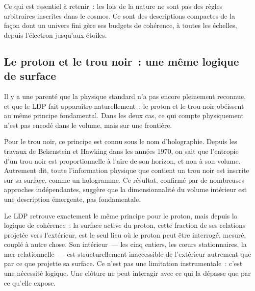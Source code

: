 \documentclass[12pt, a4paper, openright]{book}
\begin{document}
\medskip

Ce qui est essentiel à retenir~: les lois de la nature ne sont pas des règles arbitraires inscrites dans le cosmos. Ce sont des descriptions compactes de la façon dont un univers fini gère ses budgets de cohérence, à toutes les échelles, depuis l'électron jusqu'aux étoiles.

\subsection*{Le proton et le trou noir~: une même logique de surface}

Il y a une parenté que la physique standard n'a pas encore pleinement reconnue, et que le LDP fait apparaître naturellement~: le proton et le trou noir obéissent au même principe fondamental. Dans les deux cas, ce qui compte physiquement n'est pas encodé dans le volume, mais sur une frontière.

\medskip

Pour le trou noir, ce principe est connu sous le nom d'holographie. Depuis les travaux de Bekenstein et Hawking dans les années 1970, on sait que l'entropie d'un trou noir est proportionnelle à l'aire de son horizon, et non à son volume. Autrement dit, toute l'information physique que contient un trou noir est inscrite sur sa surface, comme un hologramme. Ce résultat, confirmé par de nombreuses approches indépendantes, suggère que la dimensionnalité du volume intérieur est une description émergente, pas fondamentale.

\medskip

Le LDP retrouve exactement le même principe pour le proton, mais depuis la logique de cohérence~: la surface active du proton, cette fraction de ses relations projetée vers l'extérieur, est le seul lieu où le proton peut être interrogé, mesuré, couplé à autre chose. Son intérieur~--- les cinq entiers, les c\oe{}urs stationnaires, la mer relationnelle~--- est structurellement inaccessible de l'extérieur autrement que par ce que projette sa surface. Ce n'est pas une limitation instrumentale~: c'est une nécessité logique. Une clôture ne peut interagir avec ce qui la dépasse que par ce qu'elle expose.

\medskip
\end{document}
